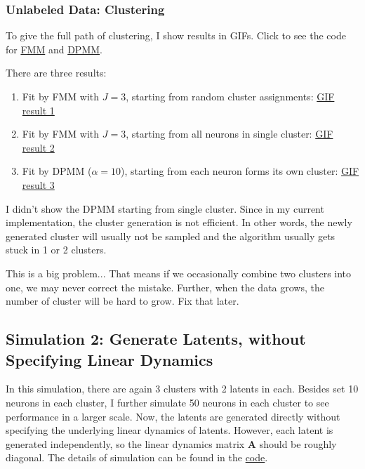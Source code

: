 \documentclass[]{article}
\begin{document}
\subsubsection{Unlabeled Data: Clustering}
To give the full path of clustering, I show results in GIFs. Click to see the code for \href{https://github.com/weigcdsb/state-space-clustering/blob/main/LDS/lds_sample_MM.m}{FMM} and \href{https://github.com/weigcdsb/state-space-clustering/blob/main/LDS/lds_sample_DP.m}{DPMM}.

There are three results:
\begin{enumerate}
	\def\labelenumi{(\arabic{enumi})}
	\item
	Fit by FMM with \(J = 3\), starting from random cluster assignments:
	\href{https://github.com/weigcdsb/state-space-clustering/blob/main/results/gif/lds_samp_10_MM_above.gif}{GIF result 1}
	\item
	Fit by FMM with \(J = 3\), starting from all neurons in single cluster: 
	\href{https://github.com/weigcdsb/state-space-clustering/blob/main/results/gif/lds_samp_10_MM_below.gif}{GIF result 2}
	\item
	Fit by DPMM (\(\alpha = 10\)), starting from each neuron forms its own cluster:
	\href{https://github.com/weigcdsb/state-space-clustering/blob/main/results/gif/lds_samp_10_DP_above_10.gif}{GIF result 3}
	
\end{enumerate}
I didn't show the DPMM starting from single cluster. Since in my current implementation, the cluster generation is not efficient. In other words, the newly generated cluster will usually not be sampled and the algorithm usually gets stuck in 1 or 2 clusters.

This is a big problem... That means if we occasionally combine two clusters into one, we may never correct the mistake. Further, when the data grows, the number of cluster will be hard to grow. Fix that later.

\subsection{Simulation 2: Generate Latents, without Specifying Linear Dynamics}
In this simulation, there are again 3 clusters with 2 latents in each. Besides set 10 neurons in each cluster, I further simulate 50 neurons in each cluster to see performance in a larger scale. Now, the latents are generated directly without specifying the underlying linear dynamics of latents. However, each latent is generated independently, so the linear dynamics matrix \(\mathbf{A}\) should be roughly diagonal. The details of simulation can be found in the \href{https://github.com/weigcdsb/state-space-clustering/blob/main/LDS/unspecifiedA_sample.m}{code}.
\end{document}
